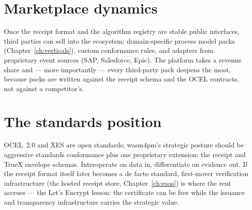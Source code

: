 \section{Marketplace dynamics}

Once the receipt format and the algorithm registry are stable public
interfaces, third parties can sell into the ecosystem: domain-specific
process model packs (Chapter~\ref{ch:verticals}), custom conformance rules,
and adapters from proprietary event sources (SAP, Salesforce, Epic).
The platform takes a revenue share and --- more importantly --- every
third-party pack deepens the moat, because packs are written against the
receipt schema and the OCEL contracts, not against a competitor's.

\section{The standards position}

OCEL~2.0 and XES are open standards; wasm4pm's strategic posture should be
aggressive standards conformance plus one proprietary extension: the
receipt and TrueX envelope schemas. Interoperate on data in, differentiate
on evidence out. If the receipt format itself later becomes a de facto
standard, first-mover verification infrastructure (the hosted receipt
store, Chapter~\ref{ch:eaas}) is where the rent accrues --- the Let's
Encrypt lesson: the certificate can be free while the issuance and
transparency infrastructure carries the strategic value.
